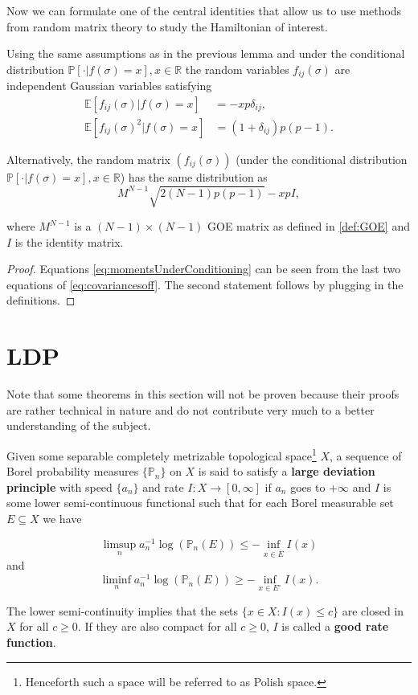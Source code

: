 Now we can formulate one of the central identities that allow us to use methods from random matrix theory to study the Hamiltonian of interest.

\begin{lemma}
	Using the same assumptions as in the previous lemma and under the conditional distribution $\mathbb P[\cdot|f(\sigma)=x], x\in\mathbb R$ the random variables $f_{ij}(\sigma)$ are independent Gaussian variables satisfying
	\begin{align}\label{eq:momentsUnderConditioning}
		\mathbb E[f_{ij}(\sigma)|f(\sigma)=x]&=-xp\delta_{ij},\nonumber\\
		\mathbb E[f_{ij}(\sigma)^2|f(\sigma)=x]&=(1+\delta_{ij})p(p-1).
	\end{align}
	
	Alternatively, the random matrix $(f_{ij}(\sigma))$ (under the conditional distribution $\mathbb P[\cdot|f(\sigma)=x], x\in\mathbb R$) has the same distribution as $$M^{N-1}\sqrt{2(N-1)p(p-1)}-xpI,$$
	
	where $M^{N-1}$ is a $(N-1)\times(N-1)$ GOE matrix as defined in \ref{def:GOE} and $I$ is the identity matrix.
\end{lemma}
\begin{proof}
	Equations \ref{eq:momentsUnderConditioning} can be seen from the last two equations of \ref{eq:covariancesoff}.
	The second statement follows by plugging in the definitions.
\end{proof}




\section{LDP}
Note that some theorems in this section will not be proven because their proofs are rather technical in nature and do not contribute very much to a better understanding of the subject.

\begin{definition}\label{def:LDP}
	Given some separable completely metrizable topological space\footnote{Henceforth such a space will be referred to as Polish space.} $X$, a sequence of Borel probability measures $\{\mathbb P_n\}$ on $X$ is said to satisfy a \textbf{large deviation principle} with speed $\{a_n\}$ and rate $I:X\rightarrow [0,\infty]$ if $a_n$ goes to $+\infty$ and $I$ is some lower semi-continuous functional such that for each Borel measurable set $E\subseteq X$ we have
	
	$$\limsup_n a_n^{-1}\log(\mathbb P_n(E))\leq -\inf_{x\in \overline E}I(x)$$
	and
	$$\liminf_n a_n^{-1}\log(\mathbb P_n(E))\geq -\inf_{x\in E^\circ}I(x).$$
	
	The lower semi-continuity implies that the sets $\{x\in X: I(x)\leq c\}$ are closed in $X$ for all $c\geq 0$. If they are also compact for all $c\geq 0$, $I$ is called a \textbf{good rate function}.
\end{definition}

